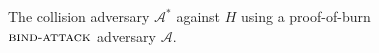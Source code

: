 \begin{figure}[t]
\begin{algorithm}[H]
    \caption{\label{alg.collision-adversary} The collision adversary $\mathcal{A}^*$ against $H$ using a proof-of-burn $\textsc{bind}\-\text{-}\-\textsc{attack}$ adversary $\mathcal{A}$.}
    \begin{algorithmic}[1]
            \State{}
        \EndFunction
    \end{algorithmic}
\end{algorithm}
\end{figure}

